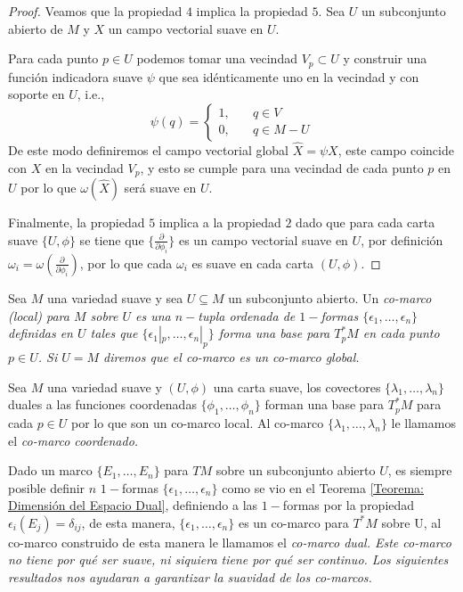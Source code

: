 \begin{proof}
	Veamos que la propiedad $4$ implica la propiedad $5$. Sea $U$ un subconjunto abierto de $M$ y $X$ un campo vectorial suave en $U$.

	Para cada punto $p \in U$ podemos tomar una vecindad $V_p \subset U$ y construir una función indicadora suave $\psi$ que sea idénticamente uno en la vecindad y con soporte en $U$, i.e.,
	\[
		\psi(q) = \begin{cases}
			1, \quad & q \in V     \\
			0, \quad & q \in M - U
		\end{cases}
	\]
	De este modo definiremos el campo vectorial global $\hat{X} = \psi X$, este campo coincide con $X$ en la vecindad $V_p$, y esto se cumple para una vecindad de cada punto $p$ en $U$ por lo que $\omega(\hat{X})$ será suave en $U$.

	Finalmente, la propiedad $5$ implica a la propiedad $2$ dado que para cada carta suave $\{U,\phi\}$ se tiene que $\{\frac{\partial}{\partial \phi_i}\}$ es un campo vectorial suave en $U$, por definición $\omega_i = \omega(\frac{\partial}{\partial \phi_i})$, por lo que cada $\omega_i$ es suave en cada carta $(U,\phi)$.
\end{proof}

\begin{definition}
	Sea $M$ una variedad suave y sea $U \subseteq M$ un subconjunto abierto. Un \it{co-marco (local) para $M$ sobre $U$} es una $n-$tupla ordenada de $1-$formas $\{\epsilon_1, \ldots, \epsilon_n\}$ definidas en $U$ tales que $\{\epsilon_1|_p, \ldots, \epsilon_n|_p\}$ forma una base para $T_{p}^{*}M$ en cada punto $p \in U$. Si $U = M$ diremos que el co-marco es un \it{co-marco global}.
\end{definition}

\begin{example}
	Sea $M$ una variedad suave y $(U,\phi)$ una carta suave, los covectores $\{\lambda_1, \ldots, \lambda_n\}$ duales a las funciones coordenadas $\{\phi_1, \ldots, \phi_n\}$ forman una base para $T_p^* M$ para cada $p \in U$ por lo que son un co-marco local. Al co-marco $\{\lambda_1, \ldots, \lambda_n\}$ le llamamos el \it{co-marco coordenado}.
\end{example}

Dado un marco $\{E_1, \ldots, E_n\}$ para $TM$ sobre un subconjunto abierto $U$, es siempre posible definir $n$ $1-$formas $\{\epsilon_1, \ldots, \epsilon_n\}$ como se vio en el Teorema \ref{Teorema: Dimensión del Espacio Dual}, definiendo a las $1-$formas por la propiedad $\epsilon_i(E_j) = \delta_{ij}$, de esta manera, $\{\epsilon_1,\ldots,\epsilon_n\}$ es un co-marco para $T^*M$ sobre U, al co-marco construido de esta manera le llamamos el \it{co-marco dual}. Este co-marco no tiene por qué ser suave, ni siquiera tiene por qué ser continuo. Los siguientes resultados nos ayudaran a garantizar la suavidad de los co-marcos.

